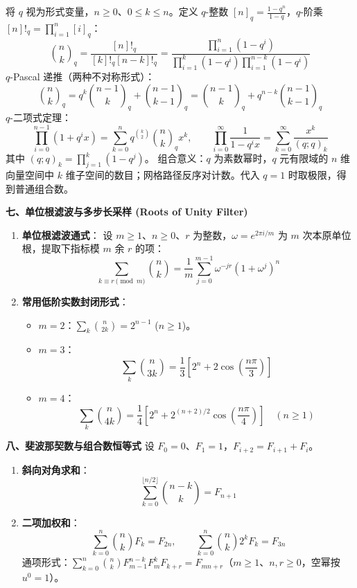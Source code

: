 \begin{enumerate}
    将 $q$ 视为形式变量，$n\ge0$、$0\le k\le n$。定义
    $q$-整数 $[n]_q = \frac{1-q^n}{1-q}$，$q$-阶乘
    $[n]!_q = \prod_{i=1}^n [i]_q$：
    \[
    \binom{n}{k}_q = \frac{[n]!_q}{[k]!_q [n-k]!_q} = \frac{\prod_{i=1}^n (1-q^i)}{\prod_{i=1}^k (1-q^i) \prod_{i=1}^{n-k} (1-q^i)}
    \]
    $q$-Pascal 递推（两种不对称形式）：
    \[
    \binom{n}{k}_q = q^k \binom{n-1}{k}_q + \binom{n-1}{k-1}_q = \binom{n-1}{k}_q + q^{n-k} \binom{n-1}{k-1}_q
    \]
    $q$-二项式定理：
    \[
    \prod_{i=0}^{n-1} (1 + q^i x) = \sum_{k=0}^n q^{\binom{k}{2}} \binom{n}{k}_q x^k, \qquad \prod_{i=0}^\infty \frac{1}{1 - q^i x} = \sum_{k=0}^\infty \frac{x^k}{(q; q)_k}
    \]
    其中 $(q; q)_k = \prod_{j=1}^k (1-q^j)$。
    组合意义：$q$ 为素数幂时，$q$ 元有限域的 $n$ 维向量空间中
    $k$ 维子空间的数目；网格路径反序对计数。代入 $q=1$ 时取极限，得到普通组合数。
\end{enumerate}

\textbf{七、单位根滤波与多步长采样 (Roots of Unity Filter)}
\begin{enumerate}
    \item \textbf{单位根滤波通式}：
    设 $m\ge1$、$n\ge0$、$r$ 为整数，$\omega = e^{2\pi i / m}$ 为
    $m$ 次本原单位根，提取下指标模 $m$ 余 $r$ 的项：
    \[
    \sum_{k \equiv r \pmod m} \binom{n}{k} = \frac{1}{m} \sum_{j=0}^{m-1} \omega^{-j r} (1 + \omega^j)^n
    \]
    \item \textbf{常用低阶实数封闭形式}：
    \begin{itemize}
        \item $m=2$：$\sum_{k} \binom{n}{2k} = 2^{n-1}$ ($n \ge 1$)。
        \item $m=3$：
        \[
        \sum_{k} \binom{n}{3k} = \frac{1}{3} \left[ 2^n + 2 \cos\left(\frac{n\pi}{3}\right) \right]
        \]
        \item $m=4$：
        \[
        \sum_{k} \binom{n}{4k} = \frac{1}{4} \left[ 2^n + 2^{(n+2)/2} \cos\left(\frac{n\pi}{4}\right) \right]\quad(n\ge1)
        \]
    \end{itemize}
\end{enumerate}

\textbf{八、斐波那契数与组合数恒等式}
设 $F_0=0$、$F_1=1$，$F_{i+2}=F_{i+1}+F_i$。
\begin{enumerate}
    \item \textbf{斜向对角求和}：
    \[
    \sum_{k=0}^{\lfloor n/2 \rfloor} \binom{n-k}{k} = F_{n+1}
    \]
    \item \textbf{二项加权和}：
    \[
    \sum_{k=0}^n \binom{n}{k} F_k = F_{2n}, \qquad \sum_{k=0}^n \binom{n}{k} 2^k F_k = F_{3n}
    \]
    通项形式：$\sum_{k=0}^n \binom{n}{k} F_{m-1}^{n-k} F_m^k F_{k+r} = F_{mn+r}$（$m\ge1$、$n,r\ge0$，空幂按 $u^0=1$）。
\end{enumerate}


